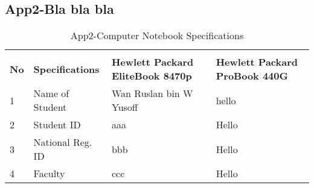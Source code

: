 \clearpage
\begin{landscape}
	\subsection{App2-Bla bla bla}
	
	\begin{table}[ht]
		\begin{center}
			\caption{App2-Computer Notebook Specifications}		
			\label{table:App2-Computer Notebook Specifications}	
			
			\begin{tabular}{ |p{0.5cm}|p{5.0cm}|p{9.0cm}|p{9.0cm}|}
				\rowcolor{gray!10}			
				\hline \multicolumn{4}{|c|}{\textbf{Computer Notebook Specifications}} \\ [1.0ex]
				\rowcolor{gray!10}
				\hline \textbf{No} & \textbf{Specifications}    & \textbf{Hewlett Packard EliteBook 8470p} & \textbf{Hewlett Packard ProBook 440G}\\ 
				
				\hline 1 & Name of Student    & Wan Ruslan bin W Yusoff & hello\\ 
				\hline 2 & Student ID         &  aaa & Hello\\ 
				\hline 3 & National Reg. ID   & bbb  & Hello\\ 
				\hline 4 & Faculty            & ccc  & Hello\\ 
				
				\hline
			\end{tabular}
		\end{center}
	\end{table}  
	
	
\end{landscape}
